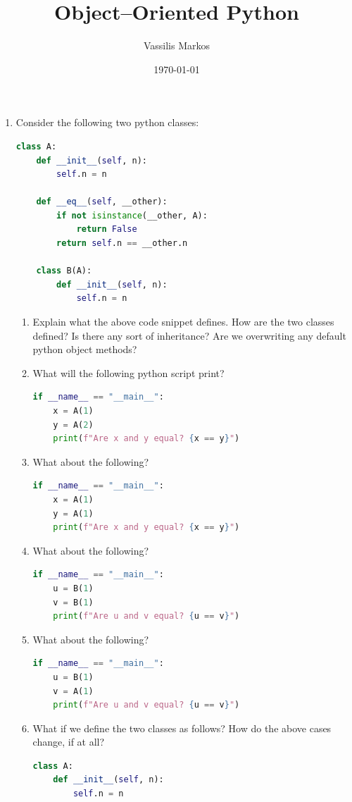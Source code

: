 \documentclass[a4paper, 11pt]{article}
\title{Object--Oriented Python}
\author{Vassilis Markos}
\date{\today}
\theoremstyle{definition}
\begin{document}
	\maketitle
	
	\begin{enumerate}[label = E\arabic*.]
		\item Consider the following two python classes:
		\begin{lstlisting}[language=Python]
class A:
	def __init__(self, n):
		self.n = n

	def __eq__(self, __other):
		if not isinstance(__other, A):
			return False
		return self.n == __other.n

	class B(A):
		def __init__(self, n):
			self.n = n
		\end{lstlisting}
		\begin{enumerate}
			\item Explain what the above code snippet defines. How are the two classes defined? Is there any sort of inheritance? Are we overwriting any default python object methods?
			\item What will the following python script print?
			\begin{lstlisting}[language=Python]
if __name__ == "__main__":
	x = A(1)
	y = A(2)
	print(f"Are x and y equal? {x == y}")
			\end{lstlisting}
			\item What about the following?
			\begin{lstlisting}[language=Python]
if __name__ == "__main__":
	x = A(1)
	y = A(1)
	print(f"Are x and y equal? {x == y}")
			\end{lstlisting}
			\item What about the following?
			\begin{lstlisting}[language=Python]
if __name__ == "__main__":
	u = B(1)
	v = B(1)
	print(f"Are u and v equal? {u == v}")
			\end{lstlisting}
			\item What about the following?
			\begin{lstlisting}[language=Python]
if __name__ == "__main__":
	u = B(1)
	v = A(1)
	print(f"Are u and v equal? {u == v}")
			\end{lstlisting}
			\item What if we define the two classes as follows? How do the above cases change, if at all?
			\begin{lstlisting}[language=Python]
class A:
	def __init__(self, n):
		self.n = n


\end{lstlisting}
\end{enumerate}
\end{enumerate}
\end{document}
